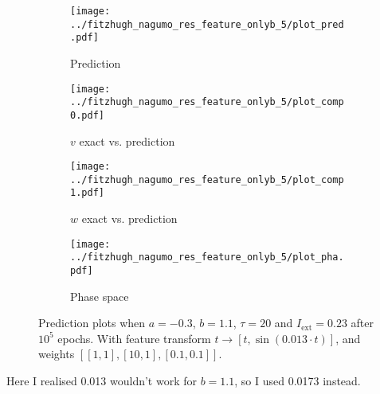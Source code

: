 \documentclass[a4paper]{article}
\begin{document}
\begin{figure}[H]
	\centering 
	\begin{subfigure}[b]{0.47\textwidth}
		\centering
		\texttt{[image: ../fitzhugh\_nagumo\_res\_feature\_onlyb\_5/plot\_pred.pdf]}
		\caption{Prediction}
		\label{fig:justb06a}
	\end{subfigure}
	\begin{subfigure}[b]{0.47\textwidth}
		\centering
		\texttt{[image: ../fitzhugh\_nagumo\_res\_feature\_onlyb\_5/plot\_comp0.pdf]}
		\caption{$v$ exact vs. prediction}
		\label{fig:justb06b}
	\end{subfigure}
	\begin{subfigure}[b]{0.47\textwidth}
		\centering
		\texttt{[image: ../fitzhugh\_nagumo\_res\_feature\_onlyb\_5/plot\_comp1.pdf]}
		\caption{$w$ exact vs. prediction}
		\label{fig:justb06c}
	\end{subfigure}
	\begin{subfigure}[b]{0.47\textwidth}
		\centering
		\texttt{[image: ../fitzhugh\_nagumo\_res\_feature\_onlyb\_5/plot\_pha.pdf]}
		\caption{Phase space}
		\label{fig:justb06d}
	\end{subfigure}
	\caption{Prediction plots when $a=-0.3$, $b=1.1$, $\tau=20$ and $ I_{\text{ext}}=0.23$ after $10^5$ epochs. With feature transform $t \rightarrow \left[ t, \sin(0.013\cdot t) \right] $, and weights $\left[ \left[ 1, 1\right], \left[ 10, 1\right], \left[ 0.1, 0.1 \right]\right]$.}
	\label{plot:justb06}
\end{figure} 	


Here I realised 0.013 wouldn't work for $b=1.1$, so I used 0.0173 instead.
\end{document}
